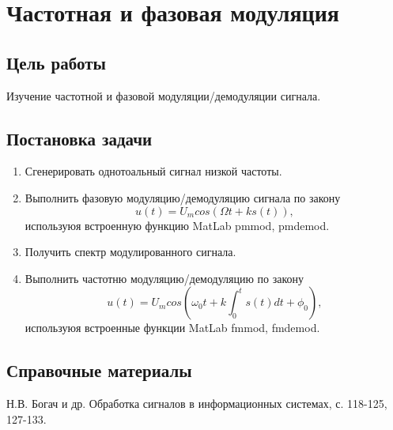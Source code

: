 \documentclass[10pt,a4paper]{article}
\begin{document}
\section{Частотная и фазовая модуляция}

\subsection{Цель работы}
Изучение частотной и фазовой модуляции/демодуляции сигнала.

\subsection{Постановка задачи}
	\begin{enumerate}
		\item Сгенерировать однотоальный сигнал низкой частоты.
		\item Выполнить фазовую модуляцию/демодуляцию сигнала по закону
				\begin{equation}
					u(t) = U_m cos(\Omega t + ks(t)),
				\end{equation}
		используюя встроенную функцию MatLab pmmod, pmdemod.
		\item Получить спектр модулированного сигнала.
		\item Выполнить частотню модуляцию/демодуляцию по закону
				\begin{equation}
					u(t) = U_m cos(\omega_0 t + k \int_0^t s(t) dt + \phi_0),
				\end{equation}
		используюя встроенные функции MatLab fmmod, fmdemod.
	\end{enumerate}

\subsection{Справочные материалы}
Н.В. Богач и др. Обработка сигналов в информационных системах, с. 118-125, 127-133.
\end{document}
